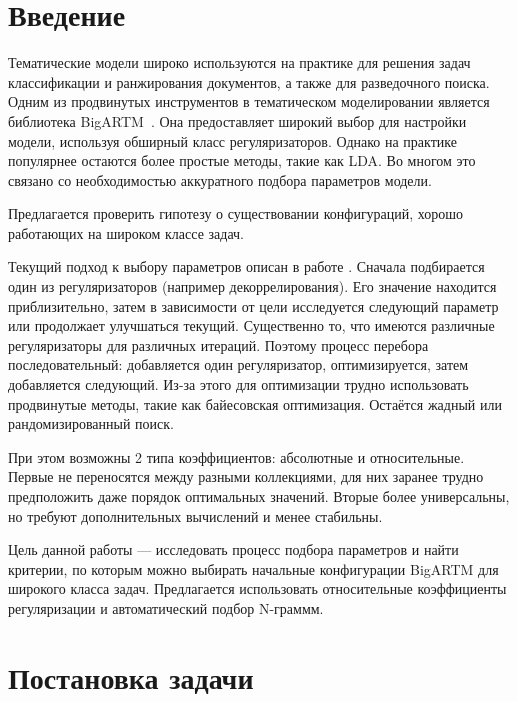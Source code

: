 \documentclass[12pt,twoside]{article}
\title
    {Автоматическая настройка параметров BigARTM под широкий класс задач.}
\author
    {Гришанов~А.\,В., Булатов~B.\,Г., Воронцов~К.\,В.} %
    [Гришанов~А.\,В.$^1$, Булатов~B.\,Г.$^1$, Воронцов~К.\,В.$^1$] %
\begin{document}
\maketitle

\section{Введение}

Тематические модели широко используются на практике для решения задач классификации и ранжирования документов, а также для разведочного поиска\cite{Ianina2016}. Одним из продвинутых инструментов в тематическом моделировании является библиотека BigARTM~\cite{vorontsov2015bigartm}. Она предоставляет широкий выбор для настройки модели, используя обширный класс регуляризаторов. Однако на практике популярнее остаются более простые методы, такие как LDA\cite{blei2003latent}. Во многом это связано со необходимостью аккуратного подбора параметров модели.

Предлагается проверить гипотезу о существовании конфигураций, хорошо работающих на широком классе задач.

Текущий подход к выбору параметров описан в работе \cite{Ianina2016}. Сначала подбирается один из регуляризаторов (например декоррелирования).  Его значение находится приблизительно, затем в зависимости от цели исследуется следующий параметр или продолжает улучшаться текущий. Существенно то, что имеются различные регуляризаторы  для различных итераций. Поэтому процесс перебора последовательный: добавляется один регуляризатор, оптимизируется, затем добавляется следующий. Из-за этого для оптимизации трудно использовать продвинутые методы, такие как байесовская оптимизация. Остаётся жадный или рандомизированный поиск.

При этом возможны 2 типа коэффициентов: абсолютные и относительные. Первые не переносятся между разными коллекциями, для них заранее трудно предположить даже порядок оптимальных значений. Вторые более универсальны, но требуют дополнительных вычислений и менее стабильны.

Цель данной работы --- исследовать процесс подбора параметров и найти критерии, по которым можно выбирать начальные конфигурации BigARTM для широкого класса задач. Предлагается использовать относительные коэффициенты регуляризации и автоматический подбор N-граммм.

\section{Постановка задачи}
\end{document}
